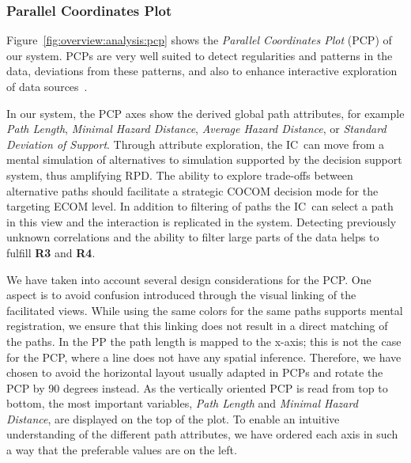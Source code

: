 \documentclass{egpubl}
\def\IC{IC}
\begin{document}
%
\subsubsection{Parallel Coordinates Plot} \label{sec:overview:analysis:pcp}
Figure~\ref{fig:overview:analysis:pcp} shows the \emph{Parallel Coordinates Plot} (PCP) of our system. PCPs are very well suited to detect regularities and patterns in the data, deviations from these patterns, and also to enhance interactive exploration of data sources~\cite{Tory05aparallel}.

In our system, the PCP axes show the derived global path attributes, for example \emph{Path Length}, \emph{Minimal Hazard Distance}, \emph{Average Hazard Distance}, or \emph{Standard Deviation of Support}. Through attribute exploration, the \IC\ can move from a mental simulation of alternatives to simulation supported by the decision support system, thus amplifying RPD. The ability to explore trade-offs between alternative paths should facilitate a strategic COCOM decision mode for the targeting ECOM level. In addition to filtering of paths the \IC\ can select a path in this view and the interaction is replicated in the system. Detecting previously unknown correlations and the ability to filter large parts of the data helps to fulfill {\bfseries R3} and {\bfseries R4}.

We have taken into account several design considerations for the PCP. One aspect is to avoid confusion introduced through the visual linking of the facilitated views. While using the same colors for the same paths supports mental registration, we ensure that this linking does not result in a direct matching of the paths. In the PP the path length is mapped to the x-axis; this is not the case for the PCP, where a line does not have any spatial inference. Therefore, we have chosen to avoid the horizontal layout usually adapted in PCPs and rotate the PCP by 90 degrees instead. As the vertically oriented PCP is read from top to bottom, the most important variables, \emph{Path Length} and \emph{Minimal Hazard Distance}, are displayed on the top of the plot. To enable an intuitive understanding of the different path attributes, we have ordered each axis in such a way that the preferable values are on the left. 
\end{document}
